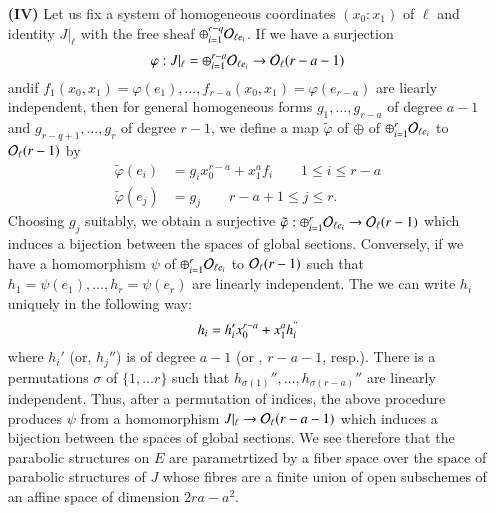 \begin{itemize}
\item[\bf(IV)] Let us fix a system of homogeneous coordinates $(x_{0} : x_{1})$ of $\ell$ and identity $J|_{\ell}$ with the free sheaf $\oplus_{i=1}^{r-q}\mathcal{O}_{\ell e_{i}}$. If we have a surjection
$$
\varphi : J|_{\ell} = \oplus_{i=1}^{r-a} \mathcal{O}_{\ell e_{i}}\rightarrow \mathcal{O}_{\ell}(r-a-1)
$$
and\pageoriginale if $f_{1}(x_{0}, x_{1}) = \varphi(e_{1}), \ldots, f_{r-a}(x_{0},x_{1}) =\varphi(e_{r-a})$ are liearly independent, then for general homogeneous forms $g_{1},\ldots, g_{r-a}$ of degree $a-1$ and $g_{r-q+1},\ldots, g_{r}$ of degree $r-1$, we define a map $\tilde{\varphi}$ of $\oplus$ of $\oplus_{i=1}^{r}\mathcal{O}_{\ell  e_{i}}$ to $\mathcal{O}_{\ell}(r-1)$ by
\begin{align*}
\tilde{\varphi}(e_{i}) &= g_{i}x_{0}^{r-a} + x_{1}^{a}f_{i} \qquad 1 \leq i \leq r-a\\
\tilde{\varphi}(e_{j}) &=g_{j} \qquad r-a + 1 \leq j \leq r.
\end{align*}
Choosing $g_{j}$ suitably, we obtain a surjective $\tilde{\varphi} : \oplus_{i=1}^{r}\mathcal{O}_{\ell e_{i}} \rightarrow \mathcal{O}_{\ell}(r-1)$ which induces a bijection between the spaces of global sections. Conversely, if we have a homomorphism $\psi$ of $\oplus_{i=1}^{r}\mathcal{O}_{\ell e_{i}}$ to $\mathcal{O}_{\ell}(r-1)$ such that $h_{1}= \psi(e_{1}), \ldots, h_{r}= \psi(e_{r})$ are linearly independent. The  we can write $h_{i}$ uniquely in the following way:
$$
h_{i}=h_{i}'x_{0}^{r-a} + x_{1}^{a}h_{i}^{"}
$$
where $h_{i}'$ (or, $h_{j}''$) is of degree $a-1$ (or , $r-a-1$, resp.). There is a permutations $\sigma$ of $\{ 1, \ldots r\}$ such that $h_{\sigma(1)}'', \ldots,h_{\sigma(r-a)}''$ are linearly independent. Thus, after a  permutation of indices, the above procedure produces $\psi$ from a homomorphism $J|_{\ell} \rightarrow \mathcal{O}_{\ell}(r-a-1)$ which induces a bijection between the spaces of global sections. We see therefore that the parabolic structures on $E$ are parametrtized by a fiber space over the space of parabolic structures of $J$ whose fibres are a finite union of open subschemes of an affine space of dimension $2ra-a^{2}$.


\end{itemize}
